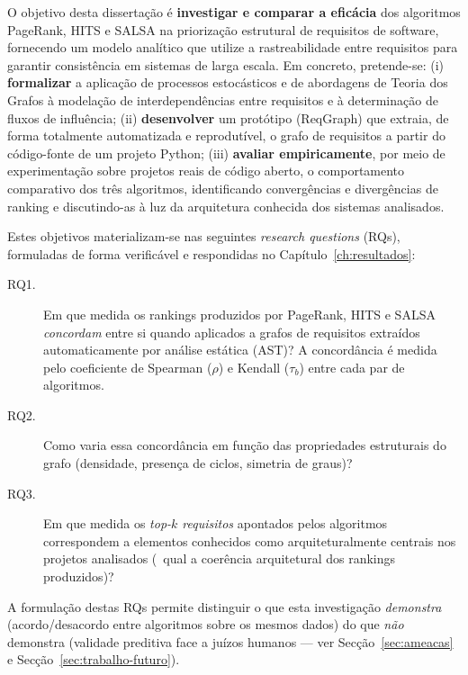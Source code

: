 O objetivo desta dissertação é \textbf{investigar e comparar a
eficácia} dos algoritmos PageRank, HITS e SALSA na priorização
estrutural de requisitos de software, fornecendo um modelo analítico
que utilize a rastreabilidade entre requisitos para garantir
consistência em sistemas de larga escala. Em concreto, pretende-se:
(i) \textbf{formalizar} a aplicação de processos estocásticos e de
abordagens de Teoria dos Grafos à modelação de interdependências entre
requisitos e à determinação de fluxos de influência;
(ii) \textbf{desenvolver} um protótipo (ReqGraph) que extraia, de
forma totalmente automatizada e reprodutível, o grafo de requisitos a
partir do código-fonte de um projeto Python; (iii) \textbf{avaliar
empiricamente}, por meio de experimentação sobre projetos reais de
código aberto, o comportamento comparativo dos três algoritmos,
identificando convergências e divergências de ranking e discutindo-as
à luz da arquitetura conhecida dos sistemas analisados.

Estes objetivos materializam-se nas seguintes \textit{research
questions} (RQs), formuladas de forma verificável e respondidas no
Capítulo~\ref{ch:resultados}:

\begin{description}
    \item[RQ1.] Em que medida os rankings produzidos por PageRank,
        HITS e SALSA \emph{concordam} entre si quando aplicados a
        grafos de requisitos extraídos automaticamente por análise
        estática (AST)? A concordância é medida pelo coeficiente de
        Spearman ($\rho$) e Kendall ($\tau_b$) entre cada par de
        algoritmos.
    \item[RQ2.] Como varia essa concordância em função das
        propriedades estruturais do grafo (densidade, presença de
        ciclos, simetria de graus)?
    \item[RQ3.] Em que medida os \emph{top-$k$ requisitos} apontados
        pelos algoritmos correspondem a elementos conhecidos como
        arquiteturalmente centrais nos projetos analisados (\ie\
        qual a coerência arquitetural dos rankings produzidos)?
\end{description}

A formulação destas RQs permite distinguir o que esta investigação
\emph{demonstra} (acordo/desacordo entre algoritmos sobre os mesmos
dados) do que \emph{não} demonstra (validade preditiva face a juízos
humanos --- ver Secção~\ref{sec:ameacas} e
Secção~\ref{sec:trabalho-futuro}).

